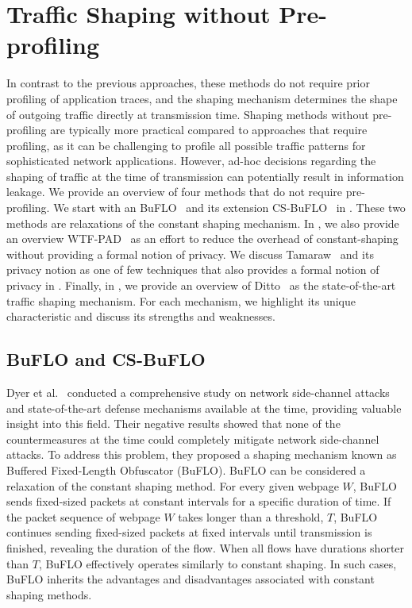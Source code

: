 \section{Traffic Shaping without Pre-profiling}\label{subsec:dynamic-traffic-shaping}
In contrast to the previous approaches, these methods do not require prior profiling of application traces, and the shaping mechanism determines the shape of outgoing traffic directly at transmission time.
Shaping methods without pre-profiling are typically more practical compared to approaches that require profiling, as it can be challenging to profile all possible traffic patterns for sophisticated network applications.
However, ad-hoc decisions regarding the shaping of traffic at the time of transmission can potentially result in information leakage.
We provide an overview of four methods that do not require pre-profiling.
We start with an BuFLO~\cite{dyer2012peek} and its extension CS-BuFLO~\cite{cai2014csbuflo} in . 
These two methods are relaxations of the constant shaping mechanism.
In , we also provide an overview WTF-PAD~\cite{juarez2016toward} as an effort to reduce the overhead of constant-shaping without providing a formal notion of privacy.
We discuss Tamaraw~\cite{cai2014systematic} and its privacy notion as one of few techniques that also provides a formal notion of privacy in .
Finally, in , we provide an overview of Ditto~\cite{meier2022ditto} as the state-of-the-art traffic shaping mechanism.  
For each mechanism, we highlight its unique characteristic and discuss its strengths and weaknesses.



\subsection{BuFLO and CS-BuFLO}\label{subsubsec:buflo}
Dyer et al.~\cite{dyer2012peek} conducted a comprehensive study on network side-channel attacks and state-of-the-art defense mechanisms available at the time, providing valuable insight into this field. 
Their negative results showed that none of the countermeasures at the time could completely mitigate network side-channel attacks.
To address this problem, they proposed a shaping mechanism known as Buffered Fixed-Length Obfuscator (BuFLO).
BuFLO can be considered a relaxation of the constant shaping method.
For every given webpage $W$, BuFLO sends fixed-sized packets at constant intervals for a specific duration of time.
If the packet sequence of webpage $W$ takes longer than a threshold, $T$, BuFLO continues sending fixed-sized packets at fixed intervals until transmission is finished, revealing the duration of the flow. 
When all flows have durations shorter than $T$, BuFLO effectively operates similarly to constant shaping.
In such cases, BuFLO inherits the advantages and disadvantages associated with constant shaping methods.~\cite{sirinam2018df}

